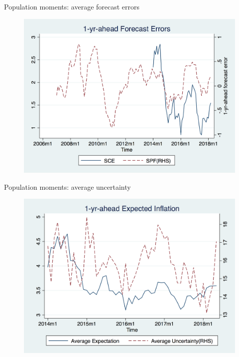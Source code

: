 \documentclass{beamer}
\begin{document}
\begin{frame}{Population moments: average forecast errors}
\begin{figure}
	\includegraphics[scale=0.3]{figures/fe_fe.png} 
\end{figure}
\end{frame}

\begin{frame}{Population moments: average uncertainty}
\begin{figure}
	\includegraphics[scale=0.3]{figures/mean_var.png} 
\end{figure}
\end{frame}
\end{document}
